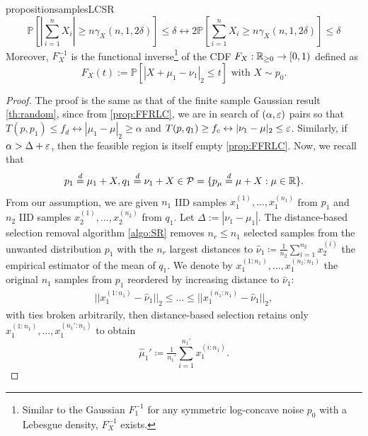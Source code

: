 \begin{restatable}{proposition}{samplesLCSR}
\begin{equation}
    \mathbb{P}\left[|\sum_{i=1}^n X_i| \geq n \gamma_X(n,1, 2\delta)\right] \leq \delta \leftrightarrow  2 \mathbb{P}\left[\sum_{i=1}^n X_i \geq n \gamma_X(n,1, 2\delta)\right] \leq \delta
\end{equation}
Moreover, $F_X^{-1}$ is the functional inverse\footnote{Similar to the Gaussian  $F_1^{-1}$ for any symmetric log-concave noise $p_0$ with a Lebesgue density, $F_X^{-1}$ exists.} of the CDF $ F_X: \mathbb{R}_{\geq 0} \to  [0,1)$ defined as
    \begin{equation}
    F_X(t):= \mathbb{P}[|X + \mu_1- \nu_1|_2 \leq t] \text{ with } X \sim p_0. 
    \end{equation}
\end{restatable}

\begin{proof}
    The proof is the same as that of the finite sample Gaussian result \ref{th:random}, since from \ref{prop:FFRLC}, we are in search of $(\alpha, \varepsilon)$ pairs so that $T(p,p_1) \leq f_d \leftrightarrow |\mu_1-\mu|_2 \geq \alpha  $ and $T(p,q_1) \geq f_c \leftrightarrow |\nu_1-\mu|_2 \leq \varepsilon $. Similarly, if $\alpha >\Delta +\varepsilon$, then the feasible region is itself empty \ref{prop:FFRLC}.
    Now, we recall that 
    \[
    p_1 \overset{d}{=} \mu_1+X, q_1 \overset{d}{=} \nu_1+ X \in \mathcal{P}= \{p_{\mu} \overset{d}{=}\mu+X: \mu \in \mathbb{R}\}.
    \] 
    From our assumption, we are given $n_1$ IID samples $x_1^{(1)}, \ldots, x_1^{(n_1)}$ from $p_1$ and $n_2$ IID samples $x_2^{(1)}, \ldots, x_2^{(n_2)}$  from $q_1$. Let $\Delta:=|\nu_1-\mu_1|$. The distance-based selection removal algorithm \ref{algo:SR} removes $n_r \leq n_1$ selected samples from the unwanted distribution $p_1$ with the $n_r$ largest distances to $\hat{\nu}_1 \coloneqq \tfrac{1}{n_2} \sum_{i=1}^{n_2} x_2^{(i)}$ the empirical estimator of the mean of $q_1$.
    We denote by $x_1^{(1:n_1)}, \ldots, x_1^{(n_1:n_1)}$ the original $n_1$ samples from $p_1$ reordered by increasing distance to $\hat{\nu}_1$:
    \begin{align}
        ||x_1^{(1:n_1)} - \hat{\nu}_1||_2
        \leq  \ldots \leq ||x_1^{(n_1:n_1)} - \hat{\nu}_1||_2,
    \end{align}
    with ties broken arbitrarily, then distance-based selection retains only $x_1^{(1:n_1)}, \ldots, x_1^{(n_1':n_1)}$ to obtain
    \begin{equation}
        \label{eq:selectionSRLC}
        \hat{\mu}_1' \coloneqq \tfrac{1}{n_1'} \sum_{i=1}^{n_1'} x_1^{(i:n_1)}.
    \end{equation}

\end{proof}
